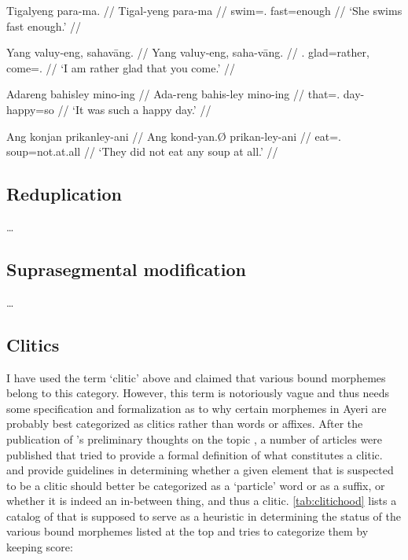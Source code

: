 \a\begingl
	\gla Tigalyeng para-ma. //
	\glb Tigal-yeng para-ma //
	\glc swim=\TsgF{}.\Aarg{} fast=enough //
	\glft `She swims fast enough.' //
\endgl

\a\begingl
	\gla Yang valuy-eng, sahavāng. //
	\glb Yang valuy-eng, saha-vāng. //
	\glc \Fsg{}.\Aarg{} glad=rather, come=\Ssg{}.\Aarg{} //
	\glft `I am rather glad that you come.' //
\endgl

\a\begingl
	\gla Adareng bahisley mino-ing //
	\glb Ada-reng bahis-ley mino-ing //
	\glc that=\TsgI{}.\Aarg{} day-\PargI{} happy=so //
	\glft `It was such a happy day.' //
\endgl

\a\begingl
	\gla Ang konjan prikanley-ani //
	\glb Ang kond-yan.Ø prikan-ley-ani //
	\glc \Aarg{} eat=\TsgM{}.\Top{} soup=not.at.all //
	\glft `They did not eat any soup at all.' //
\endgl

\xe

\subsection{Reduplication}

…

\subsection{Suprasegmental modification}

…

\subsection{Clitics}

I have used the term `clitic' above and claimed that various bound morphemes 
belong to this category. However, this term is notoriously vague and thus needs 
some specification and formalization as to why certain morphemes in Ayeri are 
probably best categorized as clitics rather than words or affixes. After the 
publication of \citeauthor{zwicky1977}'s preliminary thoughts on the topic 
\citep{zwicky1977}, a number of articles were published that tried to provide a 
formal definition of what constitutes a clitic. \citet{zwicky1985} and 
\citet{klavans1985} provide guidelines in determining whether a given element 
that is suspected to be a clitic should better be categorized as a `particle' 
word or as a suffix, or whether it is indeed an in-between thing, and thus a 
clitic. \autoref{tab:clitichood} lists a catalog of 
 that is supposed to serve as a 
heuristic in determining the status of the various bound morphemes listed at 
the top and tries to categorize them by keeping score:

